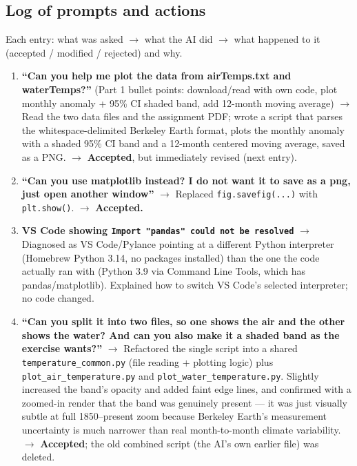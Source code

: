 \subsection*{Log of prompts and actions}

Each entry: what was asked $\rightarrow$ what the AI did $\rightarrow$ what happened to it
(accepted / modified / rejected) and why.

\begin{enumerate}[leftmargin=*, itemsep=0.8em]

\item \textbf{``Can you help me plot the data from airTemps.txt and waterTemps?''} (Part 1
bullet points: download/read with own code, plot monthly anomaly + 95\% CI shaded band, add
12-month moving average)
$\rightarrow$ Read the two data files and the assignment PDF; wrote a script that parses
the whitespace-delimited Berkeley Earth format, plots the monthly anomaly with a shaded
95\% CI band and a 12-month centered moving average, saved as a PNG.
$\rightarrow$ \textbf{Accepted}, but immediately revised (next entry).

\item \textbf{``Can you use matplotlib instead? I do not want it to save as a png, just open
another window''}
$\rightarrow$ Replaced \texttt{fig.savefig(...)} with \texttt{plt.show()}.
$\rightarrow$ \textbf{Accepted.}

\item \textbf{VS Code showing \texttt{Import "pandas" could not be resolved}}
$\rightarrow$ Diagnosed as VS Code/Pylance pointing at a different Python interpreter
(Homebrew Python 3.14, no packages installed) than the one the code actually ran with
(Python 3.9 via Command Line Tools, which has pandas/matplotlib). Explained how to switch
VS Code's selected interpreter; no code changed.

\item \textbf{``Can you split it into two files, so one shows the air and the other shows
the water? And can you also make it a shaded band as the exercise wants?''}
$\rightarrow$ Refactored the single script into a shared \texttt{temperature\_common.py}
(file reading + plotting logic) plus \texttt{plot\_air\_temperature.py} and
\texttt{plot\_water\_temperature.py}. Slightly increased the band's opacity and added faint
edge lines, and confirmed with a zoomed-in render that the band was genuinely present --- it
was just visually subtle at full 1850--present zoom because Berkeley Earth's measurement
uncertainty is much narrower than real month-to-month climate variability.
$\rightarrow$ \textbf{Accepted}; the old combined script (the AI's own earlier file) was
deleted.


\end{enumerate}
